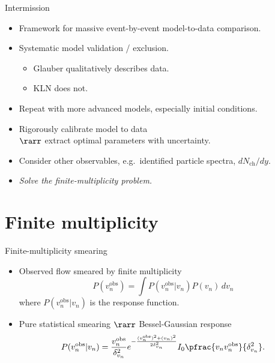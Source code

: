 \documentclass{beamer}
\begin{document}
\begin{frame}{Intermission}
  \begin{itemize}
    \item Framework for massive event-by-event model-to-data comparison.
    \item Systematic model validation / exclusion.
      \begin{itemize}
        \item Glauber qualitatively describes data.
        \item KLN does not.
      \end{itemize}
    \item Repeat with more advanced models, especially initial conditions.
      \bgs
    \item Rigorously calibrate model to data \\
      $\rarr$ extract optimal parameters with uncertainty.
    \item Consider other observables, e.g.\ identified particle spectra, $dN_\text{ch}/dy$.
      \bgs
    \item \emph{Solve the finite-multiplicity problem.}
  \end{itemize}
\end{frame}


\section{Finite multiplicity}

\begin{frame}{Finite-multiplicity smearing}
  \def\obs{^\text{obs}}

  \begin{itemize}
    \item Observed flow smeared by finite multiplicity
      \begin{equation*}
        P(v_n\obs) = \int P(v_n\obs|v_n) P(v_n) \, dv_n
      \end{equation*}
      where $P(v_n\obs|v_n)$ is the response function.
    \item Pure statistical smearing $\rarr$ Bessel-Gaussian response
      \begin{equation*}
        P(v_n^\text{obs}|v_n) = \frac{v_n^\text{obs}}{\delta_{v_n}^2} e^{ -\frac{(v_n^\text{obs})^2 + (v_n)^2}{2\delta_{v_n}^2} }
          I_0 \pfrac{v_nv_n^\text{obs}}{\delta_{v_n}^2}.
      \end{equation*}
  \end{itemize}
\end{frame}
\end{document}
